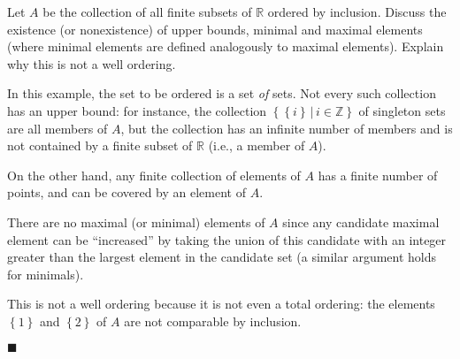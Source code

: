 \documentclass[12pt]{article}
\renewcommand{\qed}{\hfill$\blacksquare$}
\renewenvironment{proof}{\begin{addmargin}[1em]{0em}\begin{newproof}}{\end{newproof}\end{addmargin}\qed}
\newenvironment{problem}[2][Exercise]{\begin{trivlist}
\item[\hskip \labelsep {\bfseries #1}\hskip \labelsep {\bfseries #2.}]}{\end{trivlist}}
\begin{document}
\begin{problem}{I.2.1}
Let $A$ be the collection of all finite subsets of $\mathbb{R}$ ordered by inclusion. Discuss the existence (or nonexistence) of upper bounds, minimal and maximal elements (where minimal elements are defined analogously to maximal elements). Explain why this is not a well ordering.
\end{problem}
\begin{proof}
In this example, the set to be ordered is a set \textit{of} sets. Not every such collection has an upper bound: for instance, the collection $\left\{ \left\{i\right\} \, | \, i \in \mathbb{Z} \right\}$ of singleton sets are all members of $A$, but the collection has an infinite number of members and is not contained by a finite subset of $\mathbb{R}$ (i.e., a member of $A$).

On the other hand, any finite collection of elements of $A$ has a finite number of points, and can be covered by an element of $A$.

There are no maximal (or minimal) elements of  $A$ since any candidate maximal element can be ``increased'' by taking the union of this candidate with an integer greater than the largest element in the candidate set (a similar argument holds for minimals).

This is not a well ordering because it is not even a total ordering: the elements $\left\{1\right\}$ and $\left\{2\right\}$ of $A$ are not comparable by inclusion.
\end{proof}
\end{document}

